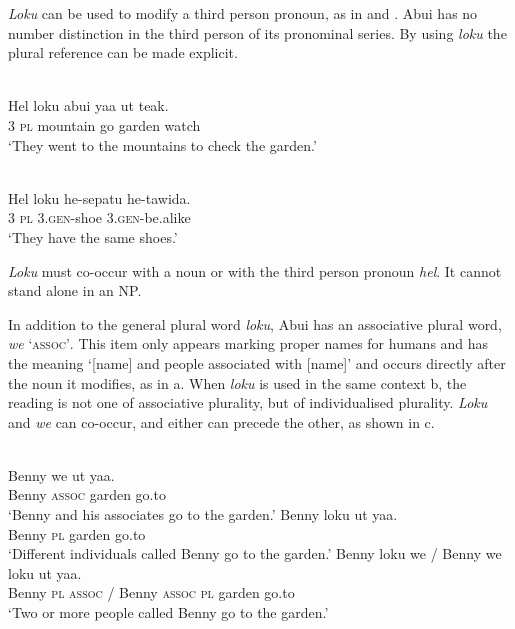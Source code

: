 \textit{Loku} can be used to modify a third person pronoun, as in  and . Abui has no number distinction in the third person of its pronominal series. By using \textit{loku} the plural reference can be made explicit.


\ea%
\label{ex:9:51}
 \\
\gll  Hel loku abui yaa ut {teak.}\\
  3 \textsc{pl}   mountain go garden watch  \\
\glt `They went to the mountains to check the garden.'
\z







\ea%
\label{ex:9:52}
 \\
\gll  Hel loku he-sepatu {he-tawida}. \\
  3 \textsc{pl}   \textsc{3.gen}-shoe \textsc{3.gen}-be.alike   \\
\glt `They have the same shoes.'
\z






\textit{Loku} must co-occur with a noun or with the third person pronoun \textit{hel}. It cannot stand alone in an NP.

In addition to the general plural word \textit{loku}, Abui has an associative plural word, \textit{we} `\textsc{assoc'}. This item only appears marking proper names for humans and has the meaning `[name] and people associated with [name]' and occurs directly after the noun it modifies, as in a. When \textit{loku} is used in the same context b, the reading is not one of associative plurality, but of individualised plurality. \textit{Loku} and \textit{we} can co-occur, and either can precede the other, as shown in c.




\ea%
\label{ex:9:53}
\ea
{} \\
\gll Benny w{e} ut yaa. \\
   Benny \textsc{assoc} garden go.to  \\
\glt `Benny and his associates go to the garden.'
\ex
\gll Benny loku ut yaa. \\
   Benny \textsc{pl} garden go.to  \\
\glt `Different individuals called Benny go to the garden.'
\ex
\gll Benny loku we / Benny  we loku ut yaa.\\
    Benny \textsc{pl}  \textsc{assoc} / Benny \textsc{assoc} \textsc{pl} garden go.to\\
\glt  `Two or more people called Benny go to the garden.'
\z
\z






